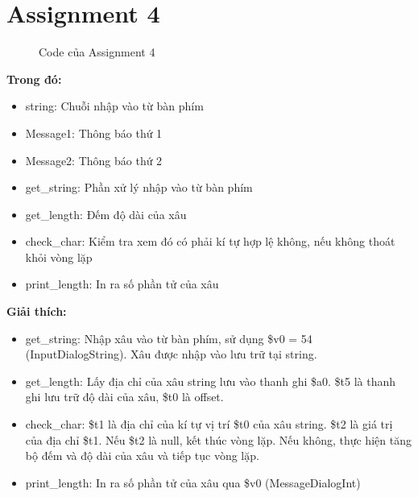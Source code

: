 \documentclass[a4paper,12pt]{article}
\begin{document}
\section{Assignment 4}
\begin{figure}[!h]
	\centerline{}
	\caption{Code của Assignment 4}
	\label{fig:ass4}
\end{figure}
\noindent
\textbf{Trong đó: }
\begin{itemize}
	\item string: Chuỗi nhập vào từ bàn phím
	\item Message1: Thông báo thứ 1
	\item Message2: Thông báo thứ 2
	\item get\_string: Phần xử lý nhập vào từ bàn phím
	\item get\_length: Đếm độ dài của xâu
	\item check\_char: Kiểm tra xem đó có phải kí tự hợp lệ không, nếu không thoát khỏi vòng lặp
	\item print\_length: In ra số phần tử của xâu
\end{itemize}
\newpage
\noindent
\textbf{Giải thích: }
\begin{itemize}
	\item get\_string: Nhập xâu vào từ bàn phím, sử dụng \$v0 = 54 (InputDialogString). Xâu được nhập vào lưu trữ tại string.
	\item get\_length: Lấy địa chỉ của xâu string lưu vào thanh ghi \$a0. \$t5 là thanh ghi lưu trữ độ dài của xâu, \$t0 là offset.
	\item check\_char: \$t1 là địa chỉ của kí tự vị trí \$t0 của xâu string. \$t2 là giá trị của địa chỉ \$t1. Nếu \$t2 là null, kết thúc vòng lặp. Nếu không, thực hiện tăng bộ đếm và độ dài của xâu và tiếp tục vòng lặp.
	\item print\_length: In ra số phần tử của xâu qua \$v0 (MessageDialogInt)
\end{itemize}
\end{document}
